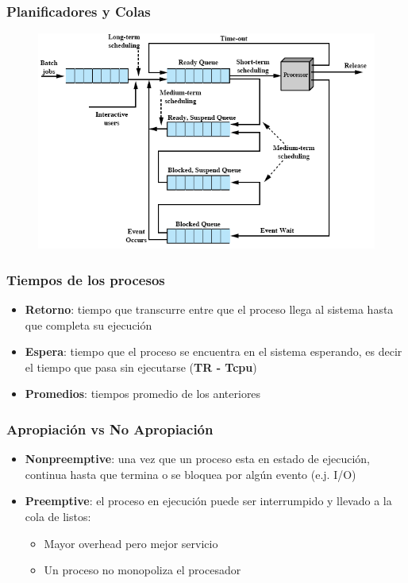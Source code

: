 \begin{frame}
  \frametitle{Planificadores y Colas}
  \begin{figure}
    \includegraphics[scale=0.4]{images/queuesSchedulers.png}
  \end{figure}
\end{frame}

\begin{frame}
  \frametitle{Tiempos de los procesos}
  \begin{itemize}
		\item \textbf{Retorno}: tiempo que transcurre entre que el proceso llega al sistema hasta que completa su ejecución
		\item \textbf{Espera}: tiempo que el proceso se encuentra en el sistema esperando, es decir el tiempo que pasa sin ejecutarse (\textbf{TR - Tcpu})
		\item \textbf{Promedios}: tiempos promedio de los anteriores
  \end{itemize}
\end{frame}

\begin{frame}
  \frametitle{Apropiación vs No Apropiación}
  \begin{itemize}
		\item \textbf{Nonpreemptive}: una vez que un proceso esta en estado de ejecución, continua hasta que termina o se bloquea por algún evento (e.j. I/O)
		\item \textbf{Preemptive}: el proceso en ejecución puede ser interrumpido y llevado a la cola de listos:
		\begin{itemize}
			\item Mayor overhead pero mejor servicio
			\item Un proceso no monopoliza el procesador
		\end{itemize}
  \end{itemize}
\end{frame}

